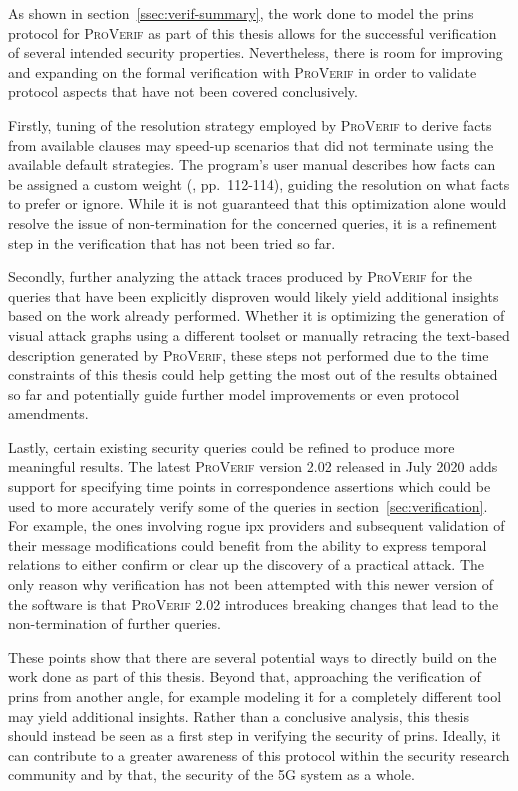 As shown in section~\ref{ssec:verif-summary}, the work done to model the \gls{prins} protocol for \textsc{ProVerif} as part of this thesis allows for the successful verification of several intended security properties.
Nevertheless, there is room for improving and expanding on the formal verification with \textsc{ProVerif} in order to validate protocol aspects that have not been covered conclusively.

Firstly, tuning of the resolution strategy employed by \textsc{ProVerif} to derive facts from available clauses may speed-up scenarios that did not terminate using the available default strategies.
The program's user manual describes how facts can be assigned a custom weight (\cite{blanchet2020proverif}, pp.~112-114), guiding the resolution on what facts to prefer or ignore.
While it is not guaranteed that this optimization alone would resolve the issue of non-termination for the concerned queries, it is a refinement step in the verification that has not been tried so far.

Secondly, further analyzing the attack traces produced by \textsc{ProVerif} for the queries that have been explicitly disproven would likely yield additional insights based on the work already performed.
Whether it is optimizing the generation of visual attack graphs using a different toolset or manually retracing the text-based description generated by \textsc{ProVerif}, these steps not performed due to the time constraints of this thesis could help getting the most out of the results obtained so far and potentially guide further model improvements or even protocol amendments.

Lastly, certain existing security queries could be refined to produce more meaningful results.
The latest \textsc{ProVerif} version 2.02 released in July 2020 adds support for specifying time points in correspondence assertions which could be used to more accurately verify some of the queries in section~\ref{sec:verification}.
For example, the ones involving rogue \gls{ipx} providers and subsequent validation of their message modifications could benefit from the ability to express temporal relations to either confirm or clear up the discovery of a practical attack.
The only reason why verification has not been attempted with this newer version of the software is that \textsc{ProVerif} 2.02 introduces breaking changes that lead to the non-termination of further queries.

These points show that there are several potential ways to directly build on the work done as part of this thesis.
Beyond that, approaching the verification of \gls{prins} from another angle, for example modeling it for a completely different tool may yield additional insights.
Rather than a conclusive analysis, this thesis should instead be seen as a first step in verifying the security of \gls{prins}.
Ideally, it can contribute to a greater awareness of this protocol within the security research community and by that, the security of the 5G system as a whole.